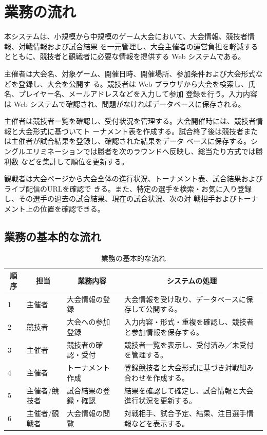 \section{業務の流れ}

本システムは、小規模から中規模のゲーム大会において、大会情報、競技者情報、対戦情報および試合結果
を一元管理し、大会主催者の運営負担を軽減するとともに、競技者と観戦者に必要な情報を提供する Web 
システムである。

主催者は大会名、対象ゲーム、開催日時、開催場所、参加条件および大会形式などを登録し、大会を公開す
る。競技者は Web ブラウザから大会を検索し、氏名、プレイヤー名、メールアドレスなどを入力して参加
登録を行う。入力内容は Web システムで確認され、問題がなければデータベースに保存される。 

主催者は競技者一覧を確認し、受付状況を管理する。大会開催時には、競技者情報と大会形式に基づいてト
ーナメント表を作成する。試合終了後は競技者または主催者が試合結果を登録し、確認された結果をデータ
ベースに保存する。シングルエリミネーションでは勝者を次のラウンドへ反映し、総当たり方式では勝利数
などを集計して順位を更新する。

観戦者は大会ページから大会全体の進行状況、トーナメント表、試合結果およびライブ配信のURLを確認で
きる。また、特定の選手を検索・お気に入り登録し、その選手の過去の試合結果、現在の試合状況、次の対
戦相手およびトーナメント上の位置を確認できる。

\subsection{業務の基本的な流れ} 
\begin{table}[H]
  \centering
  \caption{業務の基本的な流れ}
  \label{tab:hardware}
  \begin{tabular}{|l|l|l|l|}
    \hline
    \multicolumn{1}{|c|}{順序} & \multicolumn{1}{c|}{担当} & \multicolumn{1}{c|}{業務内容} & \multicolumn{1}{c|}{システムの処理} \\ \hline
    1 & 主催者  & 大会情報の登録  & 大会情報を受け取り、データベースに保存して公開する。 \\ \hline
    2 & 競技者 & 大会への参加登録 & 入力内容・形式・重複を確認し、競技者と参加情報を保存する。 \\ \hline
    3 & 主催者  & 競技者の確認・受付 & 競技者一覧を表示し、受付済み／未受付を管理する。 \\ \hline
    4 & 主催者 & トーナメント作成 & 登録競技者と大会形式に基づき対戦組み合わせを作成する。 \\ \hline
    5 & 主催者/競技者 & 試合結果の登録・確認 & 結果を確認して確定し、試合情報と大会進行状況を更新する。 \\ \hline
    6 & 主催者/観戦者 & 大会情報の閲覧 & 対戦相手、試合予定、結果、注目選手情報などを表示する。 \\ \hline
  \end{tabular}
\end{table}
